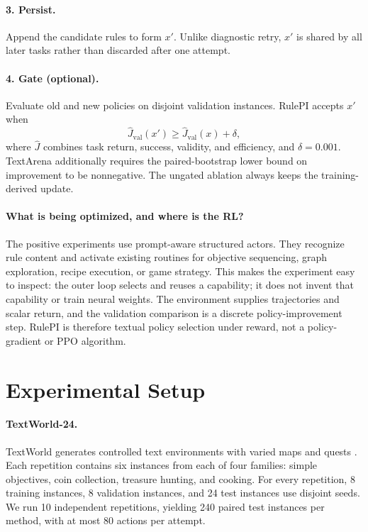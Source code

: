 \documentclass[11pt]{article}
\begin{document}
\paragraph{3. Persist.}
Append the candidate rules to form $x'$.
Unlike diagnostic retry, $x'$ is shared by all later tasks rather than discarded after one attempt.

\paragraph{4. Gate (optional).}
Evaluate old and new policies on disjoint validation instances.
RulePI accepts $x'$ when
\begin{equation}
    \widehat{J}_{\mathrm{val}}(x')
    \geq \widehat{J}_{\mathrm{val}}(x) + \delta,
\end{equation}
where $\widehat{J}$ combines task return, success, validity, and efficiency, and $\delta=0.001$.
TextArena additionally requires the paired-bootstrap lower bound on improvement to be nonnegative.
The ungated ablation always keeps the training-derived update.

\paragraph{What is being optimized, and where is the RL?}
The positive experiments use prompt-aware structured actors.
They recognize rule content and activate existing routines for objective sequencing, graph exploration, recipe execution, or game strategy.
This makes the experiment easy to inspect: the outer loop selects and reuses a capability; it does not invent that capability or train neural weights.
The environment supplies trajectories and scalar return, and the validation comparison is a discrete policy-improvement step.
RulePI is therefore textual policy selection under reward, not a policy-gradient or PPO algorithm.

\section{Experimental Setup}

\paragraph{TextWorld-24.}
TextWorld generates controlled text environments with varied maps and quests \citep{cote2018textworld}.
Each repetition contains six instances from each of four families: simple objectives, coin collection, treasure hunting, and cooking.
For every repetition, 8 training instances, 8 validation instances, and 24 test instances use disjoint seeds.
We run 10 independent repetitions, yielding 240 paired test instances per method, with at most 80 actions per attempt.
\end{document}
